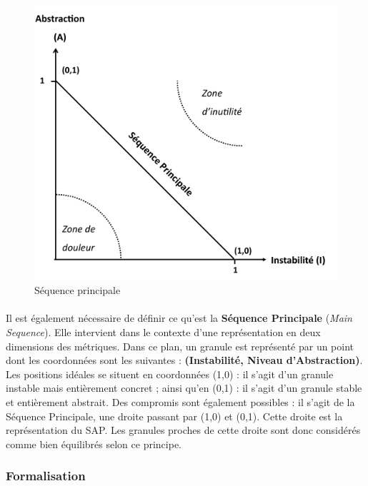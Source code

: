 \documentclass{scrartcl}
\begin{document}
\begin{figure}[ht!]
    \centering
    \includegraphics[scale=0.2]{img/MainSequence.png}
    \caption{Séquence principale}
    \label{fig:mainSeq}
\end{figure}

    \paragraph{}Il est également nécessaire de définir ce qu'est la \textbf{Séquence Principale} (\emph{Main Sequence}). Elle intervient dans le contexte d'une représentation en deux dimensions des métriques. Dans ce plan, un granule est représenté par un point dont les coordonnées sont les suivantes : \textbf{(Instabilité, Niveau d'Abstraction)}. Les positions idéales se situent en coordonnées (1,0) : il s'agit d'un granule instable mais entièrement concret ; ainsi qu'en (0,1) : il s'agit d'un granule stable et entièrement abstrait. Des compromis sont également possibles : il s'agit de la Séquence Principale, une droite passant par (1,0) et (0,1). Cette droite est la représentation du SAP. Les granules proches de cette droite sont donc considérés comme bien équilibrés selon ce principe.
    


\subsubsection{Formalisation}
    \label{martin:formalisation}
\end{document}
